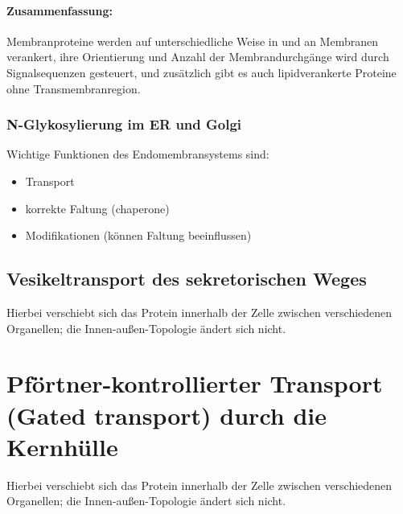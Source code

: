 \paragraph{Zusammenfassung:} Membranproteine werden auf unterschiedliche Weise in und an Membranen verankert, ihre
Orientierung und Anzahl der Membrandurchgänge wird durch Signalsequenzen gesteuert, und zusätzlich gibt es auch
lipidverankerte Proteine ohne Transmembranregion. \cite{vorlesung8}

\subsubsection*{N-Glykosylierung im ER und Golgi}
Wichtige Funktionen des Endomembransystems sind: 
\begin{itemize}
    \item Transport
    \item korrekte Faltung (\gls{chaperone})
    \item Modifikationen (können Faltung beeinflussen)
\end{itemize}

\subsection{Vesikeltransport des sekretorischen Weges}\label{subsec:vesikeltransport-des-sekretorischen-weges}
Hierbei verschiebt sich das Protein innerhalb der Zelle zwischen verschiedenen Organellen; die
Innen-außen-Topologie ändert sich nicht. \cite{Christen2024}


\section{Pförtner-kontrollierter Transport (Gated transport) durch die Kernhülle}\label{sec:kerntransport}
Hierbei verschiebt sich das Protein innerhalb der Zelle zwischen verschiedenen Organellen; die
Innen-außen-Topologie ändert sich nicht. \cite{Christen2024}

